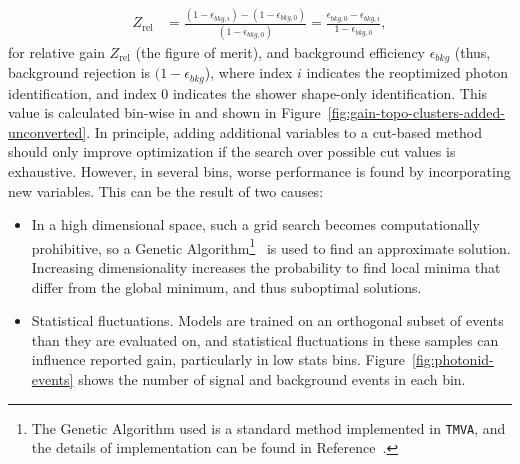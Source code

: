 \begin{align}
    Z_{\text{rel}} &= \frac{(1-\epsilon_{bkg,i}) - (1-\epsilon_{bkg,0})}{(1-\epsilon_{bkg,0})} = \frac{\epsilon_{bkg,0} - \epsilon_{bkg,i}}{1-\epsilon_{bkg,0}},
    \label{eqn:improvement-metric}
\end{align}
for relative gain $Z_{\text{rel}}$ (the figure of merit), and background efficiency $\epsilon_{bkg}$ (thus, background rejection is $(1-\epsilon_{bkg}$), where index $i$ indicates the reoptimized photon identification, and index $0$ indicates the shower shape-only identification. This value is calculated bin-wise in \etaPt and shown in Figure~\ref{fig:gain-topo-clusters-added-unconverted}. In principle, adding additional variables to a cut-based method should only improve optimization if the search over possible cut values is exhaustive. However, in several bins, worse performance is found by incorporating new variables. This can be the result of two causes:
\begin{itemize}
    \item In a high dimensional space, such a grid search becomes computationally prohibitive, so a Genetic Algorithm\footnote{The Genetic Algorithm used is a standard method implemented in \texttt{TMVA}, and the details of implementation can be found in Reference~\cite{TMVA}.}~\cite{genetic-algo} is used to find an approximate solution. Increasing dimensionality increases the probability to find local minima that differ from the global minimum, and thus suboptimal solutions.
    \item Statistical fluctuations. Models are trained on an orthogonal subset of events than they are evaluated on, and statistical fluctuations in these samples can influence reported gain, particularly in low stats bins. Figure~\ref{fig:photonid-events} shows the number of signal and background events in each \etaPt bin.
\end{itemize}
